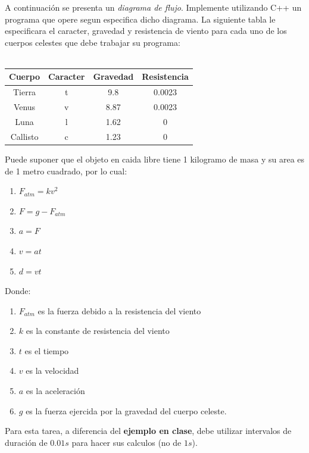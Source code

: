 \documentclass{article}
\begin{document}
A continuaci\'on se presenta un \emph{diagrama de flujo}. Implemente utilizando C++ un programa
que opere segun especifica dicho diagrama. La siguiente tabla le especificara el caracter, gravedad
y resistencia de viento para cada uno de los cuerpos celestes que debe trabajar su programa:
\\\\
\begin{tabular}{|c|c|c|c|}
    \hline
    {\bf Cuerpo} & {\bf Caracter} & {\bf Gravedad} & {\bf Resistencia} \\
    \hline
    Tierra & t & 9.8 & 0.0023 \\
    \hline
    Venus & v & 8.87 & 0.0023 \\
    \hline
    Luna & l & 1.62 & 0 \\
    \hline
    Callisto & c & 1.23 & 0 \\
    \hline
\end{tabular}
Puede suponer que el objeto en caida libre tiene 1 kilogramo de masa y su area es de 1 metro cuadrado, por lo cual:
\begin{enumerate}
    \item{$F_{atm}=kv^2$}
    \item{$F=g-F_{atm}$}
    \item{$a=F$}
    \item{$v=at$}
    \item{$d=vt$}
\end{enumerate}
Donde:
\begin{enumerate}
    \item{$F_{atm}$ es la fuerza debido a la resistencia del viento}
    \item{$k$ es la constante de resistencia del viento}
    \item{$t$ es el tiempo}
    \item{$v$ es la velocidad}
    \item{$a$ es la aceleraci\'on}
    \item{$g$ es la fuerza ejercida por la gravedad del cuerpo celeste.}
\end{enumerate}

Para esta tarea, a diferencia del {\bf ejemplo en clase}, debe utilizar intervalos de duraci\'on de
$0.01s$ para hacer sus calculos (no de $1s$).
\end{document}
